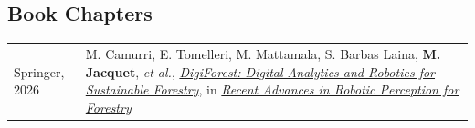 \documentclass[11pt,a4paper]{article}
\newlength{\colone}
\newlength{\coltwo}
\newcommand{\cited}[1]{\par\footnotesize{~~--Cited: #1}}
\newcommand{\me}{{\bfseries M. Jacquet}}
\begin{document}
\subsection{Book Chapters}
\begin{longtable}{@{}p{\colone}p{\coltwo}@{}}
	Springer, 2026 %
	& {
		M. Camurri, E. Tomelleri, M. Mattamala, S. Barbas Laina, \me,
		\textit{et al.},
		\href{https://doi.org/10.1007/978-3-032-15812-3_22}{\emph{DigiForest: Digital Analytics and Robotics for Sustainable Forestry}},
		in \href{https://link.springer.com/book/9783032158116}{\emph{Recent Advances in Robotic Perception for Forestry}}
	}
\end{longtable}
%
\end{document}
